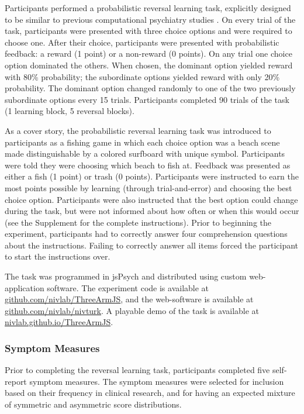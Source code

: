 \documentclass[a4paper,notitlepage,12pt]{article}
\begin{document}
Participants performed a probabilistic reversal learning task, explicitly designed to be similar to previous computational psychiatry studies \cite{waltz2007probabilistic, mukherjee_reward_2020}. On every trial of the task, participants were presented with three choice options and were required to choose one. After their choice, participants were presented with probabilistic feedback: a reward (1 point) or a non-reward (0 points). On any trial one choice option dominated the others. When chosen, the dominant option yielded reward with 80\% probability; the subordinate options yielded reward with only 20\% probability. The dominant option changed randomly to one of the two previously subordinate options every 15 trials. Participants completed 90 trials of the task (1 learning block, 5 reversal blocks). 

As a cover story, the probabilistic reversal learning task was introduced to participants as a fishing game in which each choice option was a beach scene made distinguishable by a colored surfboard with unique symbol. Participants were told they were choosing which beach to fish at. Feedback was presented as either a fish (1 point) or trash (0 points). Participants were instructed to earn the most points possible by learning (through trial-and-error) and choosing the best choice option. Participants were also instructed that the best option could change during the task, but were not informed about how often or when this would occur (see the Supplement for the complete instructions). Prior to beginning the experiment, participants had to correctly answer four comprehension questions about the instructions. Failing to correctly answer all items forced the participant to start the instructions over.

The task was programmed in jsPsych \cite{deleeuw_2015_jspsych} and distributed using custom web-application software. The experiment code is available at \url{github.com/nivlab/ThreeArmJS}, and the web-software is available at \url{github.com/nivlab/nivturk}. A playable demo of the task is available at \url{nivlab.github.io/ThreeArmJS}.

\subsubsection{Symptom Measures}

Prior to completing the reversal learning task, participants completed five self-report symptom measures. The symptom measures were selected for inclusion based on their frequency in clinical research, and for having an expected mixture of symmetric and asymmetric score distributions. 
\end{document}
